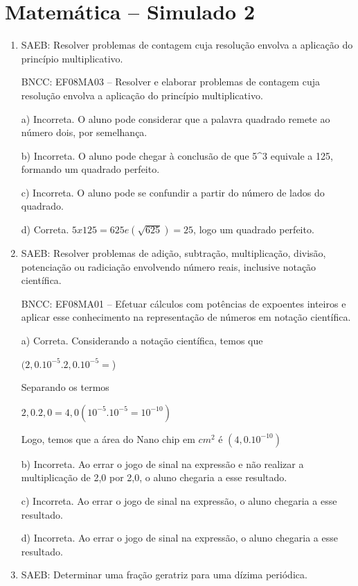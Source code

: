 \section*{Matemática – Simulado 2}

\begin{enumerate}
\item SAEB: Resolver problemas de contagem cuja resolução envolva a aplicação
do princípio multiplicativo.

BNCC: EF08MA03 -- Resolver e elaborar problemas de contagem cuja
resolução envolva a aplicação do princípio multiplicativo.

a) Incorreta. O aluno pode considerar que a palavra quadrado remete
ao número dois, por semelhança.

b) Incorreta. O aluno pode chegar à conclusão de que 5^3 equivale a
125, formando um quadrado perfeito.

c) Incorreta. O aluno pode se confundir a partir do número de lados
do quadrado.

d) Correta. $5 x 125 = 625 e (\sqrt{625}) = 25$, logo um quadrado
perfeito.

\item SAEB: Resolver problemas de adição, subtração, multiplicação, divisão,
potenciação ou radiciação envolvendo número reais, inclusive notação
científica.

BNCC: EF08MA01 -- Efetuar cálculos com potências de expoentes inteiros e
aplicar esse conhecimento na representação de números em notação
científica.

a) Correta. Considerando a notação científica, temos que

$(2,0 . 10^{-5} . 2,0 . 10^{-5} =$)

Separando os termos

$2,0 . 2,0 = 4,0

(10^{-5} . 10^{-5} = 10^{-10})$

Logo, temos que a área do Nano chip em $cm^2$ é $(4,0 . 10^{-10})$

b) Incorreta. Ao errar o jogo de sinal na expressão e não realizar
a multiplicação de 2,0 por 2,0, o aluno chegaria a esse resultado.

c) Incorreta. Ao errar o jogo de sinal na expressão, o aluno
chegaria a esse resultado.

d) Incorreta. Ao errar o jogo de sinal na expressão, o aluno
chegaria a esse resultado.
\item SAEB: Determinar uma fração geratriz para uma dízima periódica.


\end{enumerate}
